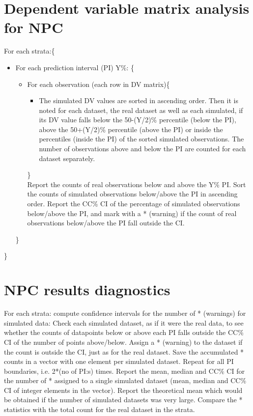 \section{Dependent variable matrix analysis for NPC}
For each strata:\{
\begin{itemize}
\item[] For each prediction interval (PI) Y\%: \{
\begin{itemize}
\item[] For each observation (each row in DV matrix)\{
\begin{itemize}
\item[] The simulated DV values are sorted in ascending order. Then it is noted for each dataset, the real dataset as well as each simulated, if its DV value falls below the 50-(Y/2)\% percentile (below the PI), above the 50+(Y/2)\% percentile (above the PI) or inside the percentiles (inside the PI) of the sorted simulated observations. The number of observations above and below the PI are counted for each dataset separately.
\end{itemize}
\}\\
Report the counts of real observations below and above the Y\% PI. Sort the counts of simulated observations below/above the PI in ascending order. Report the CC\% CI of the percentage of simulated observations below/above the PI, and mark with a * (warning) if the count of real observations below/above the PI fall outside the CI.
\end{itemize}
\}
\end{itemize}
\}
\section{NPC results diagnostics}
For each strata: compute confidence intervals for the number of * (warnings) for simulated data: Check each simulated dataset, as if it were the real data, to see whether the counts of datapoints below or above each PI falls outside the CC\% CI of the number of points above/below. Assign a * (warning) to the dataset if the count is outside the CI, just as for the real dataset. Save the accumulated * counts in a vector with one element per simulated dataset. Repeat for all PI boundaries, i.e. 2*(no of PI:s) times. Report the mean, median and CC\% CI for the number of * assigned to a single simulated dataset (mean, median and CC\% CI of integer elements in the vector). Report the theoretical mean which would be obtained if the number of simulated datasets was very large. Compare the * statistics with the total count for the real dataset in the strata. 

